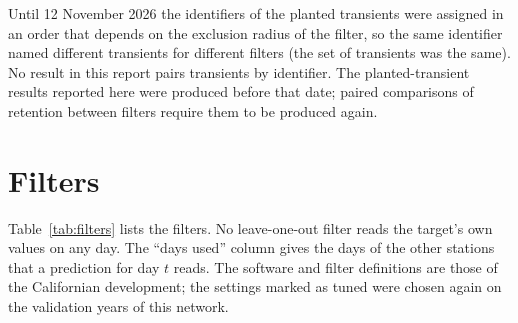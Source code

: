 \documentclass[preprint,12pt,authoryear]{elsarticle}
\begin{document}
Until 12 November 2026 the identifiers of the planted transients were assigned in an order that depends on the exclusion radius of the filter, so the same identifier named different transients for different filters (the set of transients was the same). No result in this report pairs transients by identifier. The planted-transient results reported here were produced before that date; paired comparisons of retention between filters require them to be produced again.

\section{Filters}
\label{sec:filters}

Table~\ref{tab:filters} lists the filters. No leave-one-out filter reads the target's own values on any day. The ``days used'' column gives the days of the other stations that a prediction for day $t$ reads. The software and filter definitions are those of the Californian development; the settings marked as tuned were chosen again on the validation years of this network.
\end{document}
